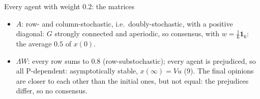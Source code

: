 \documentclass[10pt, aspectratio=169]{beamer}
\begin{document}
\begin{frame}[label=m-fj-matrices-all]{Every agent with weight $0.2$: the matrices}
  \footnotesize
  \begin{itemize}
    \setlength{\itemsep}{1pt}
    \item $A$: row- and column-stochastic, i.e.\ doubly-stochastic, with a positive diagonal:
          $G$ strongly connected and aperiodic, so consensus, with $w = \frac16\mathbf{1}_6$:
          the average $0.5$ of $x(0)$.
    \item $\Lambda W$: every row sums to $0.8$ (row-substochastic); every agent is
          prejudiced, so all P-dependent: asymptotically stable, $x(\infty) = Vu$ (9).
          The final opinions are closer to each other than the initial ones, but not
          equal: the prejudices differ, so no consensus.
  \end{itemize}
\end{frame}
\end{document}
